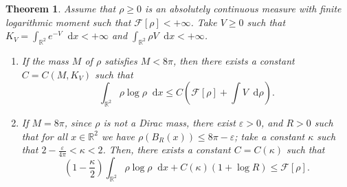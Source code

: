 \documentclass[10pt,a4paper]{amsart}
\newcommand{\R}{{\mathbb{R}}}
\newcommand{\f}{\frac}
\newcommand{\diff}{\mathop{}\!\mathrm{d}}
\theoremstyle{plain}
\newtheorem{theorem}{Theorem}[section]
\theoremstyle{remark}
\begin{document}
\begin{theorem}\label{thm:new_proof_hls}
Assume that $\rho\ge 0$ is an absolutely continuous measure with finite logarithmic moment such that $\mathcal{F}[\rho]<+\infty$. Take $V\ge0$ such that $K_V=\int_{\R^2}e^{-V}\diff x<+\infty$ and
$\int_{\R^2}\rho V\diff x<+\infty$.
\begin{enumerate}
    \item If the mass $M$ of $\rho$ satisfies $M<8\pi$, then there exists a constant $C=C(M,K_V)$ such that
    $$
        \int_{\R^2}\rho\log\rho\diff x\leq C \left(\mathcal{F}[\rho]+\int V\diff\rho \right).
    $$
    \item If $M=8\pi$, since $\rho$ is not a  Dirac mass,  there exist $\varepsilon>0$, and $R>0$ such that for all $x\in\R^2$ we have $\rho(
B_{R}(x))\leq 8\pi-\varepsilon$; take a constant $\kappa$ such that  $2 - \f{\varepsilon}{4\pi}<\kappa<2$. Then, there exists a constant $C=C(\kappa)$  such that
$$
\left(1-\frac{\kappa}{2}\right)\int_{\R^2}\rho\log\rho\diff x +  C(\kappa)(1+\log R)\le \mathcal{F}[\rho].
$$
\end{enumerate}
\end{theorem}
\end{document}
